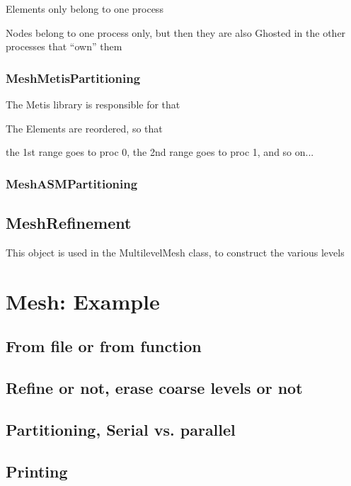\documentclass[10pt]{book}
\begin{document}
 Elements only belong to one process
 
 Nodes belong to one process only, but then they are also Ghosted in the other processes that ``own'' them
 
 
 
 
    \subsection{MeshMetisPartitioning}

  The Metis library is responsible for that

  
  The Elements are reordered, so that 
  
  the 1st range goes to proc 0, the 2nd range goes to proc 1, and so on...
  
  
    \subsection{MeshASMPartitioning}
  

  
  \section{MeshRefinement}

   
    This object is used in the MultilevelMesh class, to construct the various levels
  
 \chapter{Mesh: Example}
 
   \section{From file or from function}
   
   \section{Refine or not, erase coarse levels or not}
  
   \section{Partitioning, Serial vs. parallel}
   
   \section{Printing}
   
\end{document}
